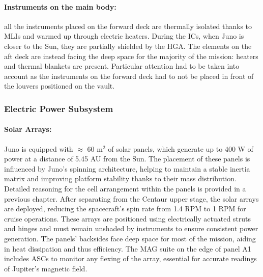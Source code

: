 \paragraph{Instruments on the main body:} all the instruments placed on the forward deck are thermally isolated thanks to MLIs and warmed up through electric heaters.
During the ICs, when Juno is closer to the Sun, they are partially shielded by the HGA.\cite{JADE_info}\cite{JEDI_info}
The elements on the aft deck are instead facing the deep space for the majority of the mission: heaters and thermal blankets are present. \cite{Waves_info}
Particular attention had to be taken into account as the instruments on the forward deck had to not be placed in front of the louvers positioned on the vault. 

\subsubsection{Electric Power Subsystem}
\label{subsubsec:eps_sub}

\vspace{-2mm}

\paragraph{Solar Arrays:}Juno is equipped with $\approx$ 60 m$^2$ of solar panels, which generate up to 400 W of power at a distance of 5.45 AU from the Sun. \cite{pannelli}
The placement of these panels is influenced by Juno's spinning architecture, helping to maintain a stable inertia matrix and improving platform stability thanks to their mass distribution. \cite{solar_panels_coef}
Detailed reasoning for the cell arrangement within the panels is provided in a previous chapter.
After separating from the Centaur upper stage, the solar arrays are deployed, reducing the spacecraft's spin rate from 1.4 RPM to 1 RPM for cruise operations. \cite{Juno_launch}
These arrays are positioned using electrically actuated struts and hinges and must remain unshaded by instruments to ensure consistent power generation.
The panels' backsides face deep space for most of the mission, aiding in heat dissipation and thus efficiency.
The MAG suite on the edge of panel A1 includes ASCs to monitor any flexing of the array, essential for accurate readings of Jupiter's magnetic field. 

\vspace{-4mm}


